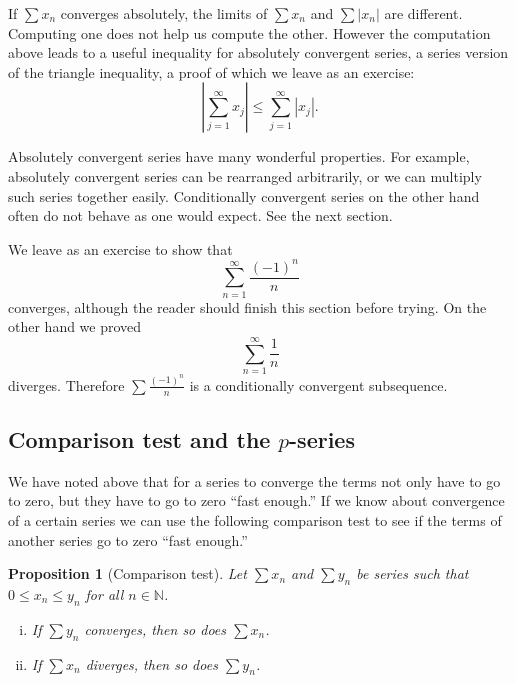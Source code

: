 \documentclass[12pt]{book}
\newcommand{\abs}[1]{\left\lvert {#1} \right\rvert}
\newcommand{\N}{{\mathbb{N}}}
\theoremstyle{plain}
\newtheorem{prop}[thm]{Proposition}
\theoremstyle{remark}
\theoremstyle{definition}
\theoremstyle{exercise}
\theoremstyle{example}
\begin{document}
If $\sum x_n$ converges absolutely, the limits of
$\sum x_n$ and $\sum \abs{x_n}$ are different.  Computing one
does not help us compute the other.  However the computation above leads to
a useful inequality for absolutely convergent series,
a series version of the triangle inequality,
a proof of which we leave as an exercise:
\begin{equation*}
\abs{ \sum_{j=1}^\infty x_j }
\leq
\sum_{j=1}^\infty \abs{x_j} .
\end{equation*}

Absolutely convergent series have many wonderful properties.
For example, absolutely convergent
series can be rearranged arbitrarily, or we can multiply such
series together easily.  Conditionally convergent series on the other hand
often do not behave as one would expect.  See the next section.

We leave as an exercise to show that
\begin{equation*}
\sum_{n=1}^\infty \frac{{(-1)}^n}{n}
\end{equation*}
converges, although the reader should finish this section before trying.
On the other hand we proved
\begin{equation*}
\sum_{n=1}^\infty \frac{1}{n}
\end{equation*}
diverges.  Therefore 
$\sum \frac{{(-1)}^n}{n}$ is a conditionally convergent subsequence.

\subsection{Comparison test and the \texorpdfstring{$p$}{p}-series}

We have noted above that for a series to converge
the terms not only have to go to zero, but they have to go to zero ``fast
enough.''  If we know about convergence of a certain series
we can use the following comparison test to see if the terms of another
series go to zero ``fast enough.''

\begin{samepage}
\begin{prop}[Comparison test]
Let $\sum x_n$ and $\sum y_n$ be series such that $0 \leq x_n \leq y_n$
for all $n \in \N$.
\begin{enumerate}[(i)]
\item If $\sum y_n$ converges, then so does $\sum x_n$.
\item If $\sum x_n$ diverges, then so does $\sum y_n$.
\end{enumerate}
\end{prop}
\end{samepage}
\end{document}

